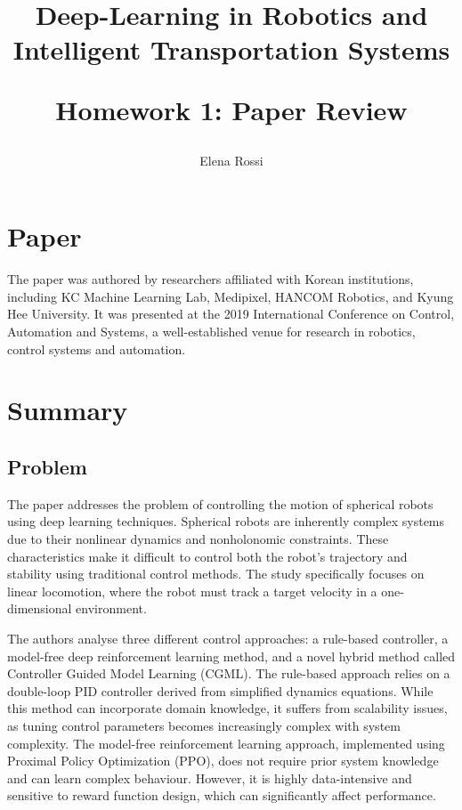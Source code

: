 \documentclass{article}
\title{Deep-Learning in Robotics and Intelligent Transportation Systems

Homework 1: Paper Review}
\author{Elena Rossi}
\date{}
\begin{document}
\maketitle

\section{Paper}
The paper \cite{8971544} was authored by researchers affiliated with Korean institutions, including KC Machine Learning Lab, Medipixel, HANCOM Robotics, and Kyung Hee University. It was presented at the 2019 International Conference on Control, Automation and Systems, a well-established venue for research in robotics, control systems and automation.

\section{Summary}

\subsection{Problem}
The paper addresses the problem of controlling the motion of spherical robots using deep learning techniques. Spherical robots are inherently complex systems due to their nonlinear dynamics and nonholonomic constraints. These characteristics make it difficult to control both the robot's trajectory and stability using traditional control methods. The study specifically focuses on linear locomotion, where the robot must track a target velocity in a one-dimensional environment.\vspace{8pt}

\noindent The authors analyse three different control approaches: a rule-based controller, a model-free deep reinforcement learning method, and a novel hybrid method called Controller Guided Model Learning (CGML). The rule-based approach relies on a double-loop PID controller derived from simplified dynamics equations. While this method can incorporate domain knowledge, it suffers from scalability issues, as tuning control parameters becomes increasingly complex with system complexity. The model-free reinforcement learning approach, implemented using Proximal Policy Optimization (PPO), does not require prior system knowledge and can learn complex behaviour. However, it is highly data-intensive and sensitive to reward function design, which can significantly affect performance.
\end{document}

